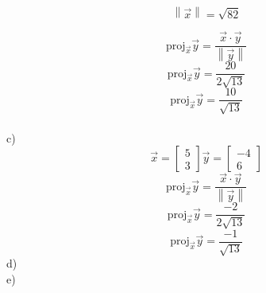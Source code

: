 \documentclass[12pt]{article}
\newcommand{\dbarl}{\left\lVert}
\newcommand{\dbarr}{\right\rVert}
\begin{document}
	\[\dbarl \vec x \dbarr = \sqrt{82}\]

	\[\text{proj}_{\vec{x}}\vec y = \frac{\vec x \cdot \vec y}{\dbarl\vec y\dbarr} \]
	\[\text{proj}_{\vec{x}}\vec y = \frac{20}{2\sqrt{13}}\]
	\[\text{proj}_{\vec{x}}\vec y = \frac{10}{\sqrt{13}}\]\\
c)\\
	\[\vec x = \left[\begin{matrix}5\\3\end{matrix}\right] \vec y = \left[\begin{matrix}-4\\6\end{matrix}\right]\]
	\[\text{proj}_{\vec x}\vec y = \frac{\vec x \cdot \vec y}{\dbarl\vec y\dbarr}\]
	\[\text{proj}_{\vec x}\vec y = \frac{-2}{2\sqrt{13}}\]
	\[\text{proj}_{\vec x}\vec y = \frac{-1}{\sqrt{13}}\]
d)\\
e)\\
\end{document}

